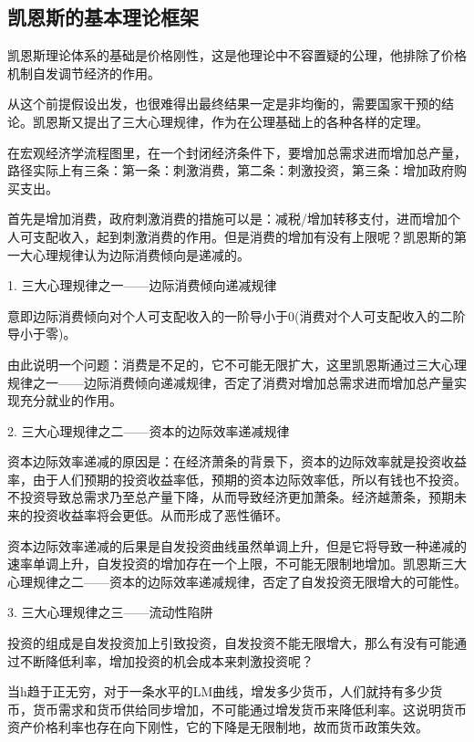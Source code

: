 \documentclass{article}
\begin{document}
\subsection{凯恩斯的基本理论框架}
凯恩斯理论体系的基础是价格刚性，这是他理论中不容置疑的公理，他排除了价格机制自发调节经济的作用。

从这个前提假设出发，也很难得出最终结果一定是非均衡的，需要国家干预的结论。凯恩斯又提出了三大心理规律，作为在公理基础上的各种各样的定理。

在宏观经济学流程图里，在一个封闭经济条件下，要增加总需求进而增加总产量，路径实际上有三条：第一条：刺激消费，第二条：刺激投资，第三条：增加政府购买支出。

\hspace*{\fill}

首先是增加消费，政府刺激消费的措施可以是：减税/增加转移支付，进而增加个人可支配收入，起到刺激消费的作用。但是消费的增加有没有上限呢？凯恩斯的第一大心理规律认为边际消费倾向是递减的。

1. 三大心理规律之一——边际消费倾向递减规律

意即边际消费倾向对个人可支配收入的一阶导小于0(消费对个人可支配收入的二阶导小于零)。

由此说明一个问题：消费是不足的，它不可能无限扩大，这里凯恩斯通过三大心理规律之一——边际消费倾向递减规律，否定了消费对增加总需求进而增加总产量实现充分就业的作用。

\hspace*{\fill}

2. 三大心理规律之二——资本的边际效率递减规律

资本边际效率递减的原因是：在经济萧条的背景下，资本的边际效率就是投资收益率，由于人们预期的投资收益率低，预期的资本边际效率低，所以有钱也不投资。不投资导致总需求乃至总产量下降，从而导致经济更加萧条。经济越萧条，预期未来的投资收益率将会更低。从而形成了恶性循环。

资本边际效率递减的后果是自发投资曲线虽然单调上升，但是它将导致一种递减的速率单调上升，自发投资的增加存在一个上限，不可能无限制地增加。凯恩斯三大心理规律之二——资本的边际效率递减规律，否定了自发投资无限增大的可能性。

\hspace*{\fill}

3. 三大心理规律之三——流动性陷阱

投资的组成是自发投资加上引致投资，自发投资不能无限增大，那么有没有可能通过不断降低利率，增加投资的机会成本来刺激投资呢？

当h趋于正无穷，对于一条水平的LM曲线，增发多少货币，人们就持有多少货币，货币需求和货币供给同步增加，不可能通过增发货币来降低利率。这说明货币资产价格利率也存在向下刚性，它的下降是无限制地，故而货币政策失效。
\end{document}
